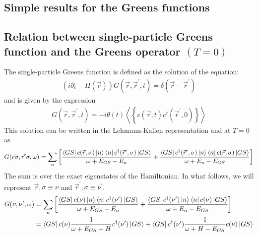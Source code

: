 \documentclass{report}
\numberwithin{equation}{section}
\begin{document}
\begin{appendices}
\chapter{Simple results for the Greens functions}
\section{Relation between single-particle Greens function and the Greens operator $(T=0)$}
 The single-particle Greens function is defined as the solution of the equation:
 \begin{equation}\begin{aligned}
	 \left(i\partial_t - H(\vec r)\right)G(\vec r,\vec r^\prime, t) = \delta(\vec r - \vec r^\prime)
 \end{aligned}\end{equation}
 and is given by the expression
 \begin{equation}\begin{aligned}
	 G(\vec r,\vec r^\prime, t) = -i \theta(t) \left< \left\{ c(\vec r, t) c^\dagger(\vec r^\prime, 0)\right\} \right>
 \end{aligned}\end{equation}
 This solution can be written in the Lehmann-Kallen representation  and at $T=0$ as
 \begin{equation}\begin{aligned}
	 G(\vec r \sigma, \vec r^\prime \sigma, \omega) = \sum_{n}\left[\frac{\bra{GS}c({\vec r,\sigma})\ket{n}\bra{n}c^\dagger(\vec r^\prime,\sigma)\ket{GS}}{\omega + E_{GS} - E_n} + \frac{\bra{GS}c^\dagger(\vec r^\prime,\sigma)\ket{n}\bra{n}c({\vec r,\sigma})\ket{GS}}{\omega + E_n - E_{GS}}\right]
 \end{aligned}\end{equation}
 The sum is over the exact eigenstates of the Hamiltonian. In what follows, we will represent $\vec r,\sigma \equiv \nu$ and $\vec r^\prime,\sigma \equiv \nu^\prime$.
 \begin{equation}\begin{aligned}
	 G(\nu, \nu^\prime, \omega) &= \sum_{n}\left[\frac{\bra{GS}c(\nu)\ket{n}\bra{n}c^\dagger(\nu^\prime)\ket{GS}}{\omega + E_{GS} - E_n} + \frac{\bra{GS}c^\dagger(\nu^\prime)\ket{n}\bra{n}c(\nu)\ket{GS}}{\omega + E_n - E_{GS}}\right]\\
							&= \bra{GS}c(\nu)\frac{1}{\omega + E_{GS} - H}c^\dagger(\nu^\prime)\ket{GS} + \bra{GS}c^\dagger(\nu^\prime)\frac{1}{\omega + H - E_{GS}}c(\nu)\ket{GS}\\
 \end{aligned}\end{equation}

\end{appendices}
\end{document}
